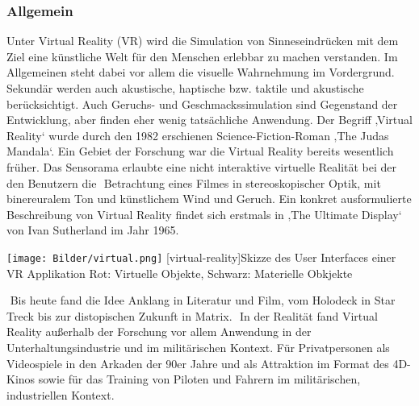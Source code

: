 \documentclass[12pt,a4paper,bibliography=totocnumbered,listof=totocnumbered]{scrartcl}
\begin{document}
\subsubsection{Allgemein}
Unter Virtual Reality (\ac{VR}) wird die Simulation von Sinneseindrücken mit dem Ziel eine künstliche Welt für den Menschen erlebbar zu machen verstanden. Im Allgemeinen steht dabei vor allem die visuelle Wahrnehmung im Vordergrund. Sekundär werden auch akustische, haptische bzw. taktile und akustische berücksichtigt. Auch Geruchs- und Geschmackssimulation sind Gegenstand der Entwicklung, aber finden eher wenig tatsächliche Anwendung.
Der Begriff ‚Virtual Reality‘ wurde durch den 1982 erschienen Science-Fiction-Roman ‚The Judas Mandala‘. Ein Gebiet der Forschung war die Virtual Reality bereits wesentlich früher.
Das Sensorama erlaubte eine nicht interaktive virtuelle Realität bei der den Benutzern die  Betrachtung eines Filmes in stereoskopischer Optik, mit binereuralem Ton und künstlichem Wind und Geruch. Ein konkret ausformulierte Beschreibung von Virtual Reality findet sich erstmals in ‚The Ultimate Display‘ von Ivan Sutherland im Jahr 1965.

\begin{minipage}{\linewidth}
\vspace{1em}
	\centering
	\texttt{[image: Bilder/virtual.png]}
	[virtual-reality]{Skizze des User Interfaces einer VR Applikation\newline
	Rot: Virtuelle Objekte, Schwarz: Materielle Obkjekte}
	\label{fig:virtual_reality}
\vspace{1em}
\end{minipage}
 Bis heute fand die Idee Anklang in Literatur und Film, vom Holodeck in Star Treck bis zur distopischen Zukunft in Matrix.  In der Realität fand Virtual Reality außerhalb der Forschung vor allem Anwendung in der Unterhaltungsindustrie und im militärischen Kontext. Für Privatpersonen als Videospiele in den Arkaden der 90er Jahre und als Attraktion im Format des 4D-Kinos sowie für das Training von Piloten und Fahrern im militärischen, industriellen Kontext.
\end{document}
